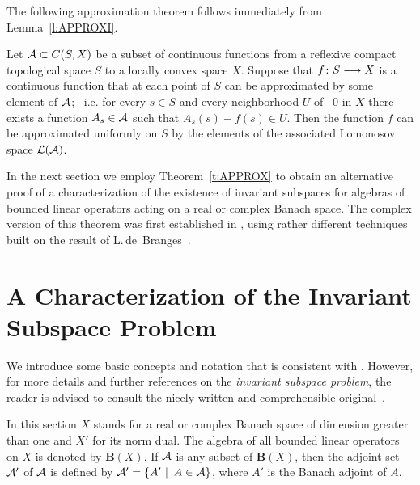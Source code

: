 \medskip
\goodbreak

The following approximation theorem follows immediately from
Lemma~\ref{l:APPROXI}.

\smallskip

\begin{thm}\label{t:APPROX}
Let ${\cal A} \subset C(S,X)$ be a subset of continuous functions from a reflexive
compact topological space $S$ to a locally convex space $X$. Suppose that
$f\colon S \longrightarrow X$ is a continuous function that at each point of $S$ can be
approximated by some element of ${\cal A}$; \, i.e. for every $s\in{S}$ and every
neighborhood $U$ of \, $0$ in $X$ there exists a function $A_s\in{\cal A}$ such
that $A_s(s)-f(s)\in{U}$. Then the function $f$ can be approximated uniformly
on $S$ by the elements of the associated Lomonosov space $\cal{L}({\cal A})$.
\end{thm}

\smallskip

In the next section we employ Theorem~\ref{t:APPROX} to obtain an alternative
proof of a characterization of the existence of invariant subspaces for
algebras of bounded linear operators acting on a real or complex Banach
space. The complex version of this theorem was first established in
\cite{AAB95}, using rather different techniques built on the result of
L.\,de~Branges~\cite{dB93}.

\goodbreak

\def\baselinestretch{1.1}

\section{A Characterization of the Invariant Subspace Problem}

We introduce some basic concepts and notation that is consistent with
\cite{AAB95}. However, for more details and further references on the {\em
invariant subspace problem}, the reader is advised to consult the nicely
written and comprehensible original~\cite{AAB95}.

\def\baselinestretch{1.66}
\medskip

In this section $X$ stands for a real or complex Banach space of dimension
greater than one and $X'$ for its norm dual. The algebra of all bounded
linear operators on $X$ is denoted by $\mathbf{B}(X)$. If ${\cal A}$ is any subset
of $\mathbf{B}(X)$, then the adjoint set ${\cal A}'$ of ${\cal A}$ is defined by
${\cal A}'=\left\{A'\,\,|\,\,\, A\in{\cal A}\right\}$, where $A'$ is the Banach adjoint of $A$.


